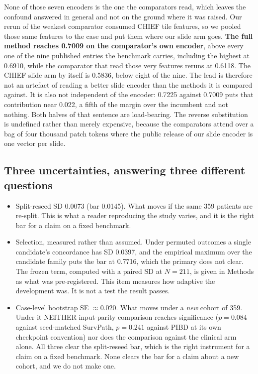 \documentclass[unnumsec,webpdf,contemporary,large]{oup-authoring-template}
\begin{document}
None of those seven encoders is the one the comparators read, which leaves the confound answered in
general and not on the ground where it was raised. Our rerun of the weakest comparator consumed
CHIEF tile features, so we pooled those same features to the case and put them where our slide arm
goes. \textbf{The full method reaches 0.7009 on the comparator's own encoder}, above every one of
the nine published entries the benchmark carries, including the highest at 0.6910, while the
comparator that read those very features reruns at 0.6118. The CHIEF slide arm by itself is 0.5836,
below eight of the nine. The lead is therefore not an artefact of reading a better slide encoder
than the methods it is compared against. It is also not independent of the encoder: 0.7225 against
0.7009 puts that contribution near 0.022, a fifth of the margin over the incumbent and not nothing.
Both halves of that sentence are load-bearing. The reverse substitution is undefined rather than
merely expensive, because the comparators attend over a bag of four thousand patch tokens where the
public release of our slide encoder is one vector per slide.

\subsection{Three uncertainties, answering three different questions}
\label{sec:uncertainty}

\begin{itemize}
  \item Split-reseed SD 0.0073 (bar 0.0145). What moves if the same 359 patients are
    re-split. This is what a reader reproducing the study varies, and it is the right bar for a
    claim on a fixed benchmark.
  \item Selection, measured rather than assumed. Under permuted outcomes a single candidate's
    concordance has SD 0.0397, and the empirical maximum over the candidate family puts the
    bar at 0.7716, which the primary does not clear. The frozen term, computed with a paired SD
    at $N=211$, is given in Methods as what was pre-registered. This item measures how adaptive
    the development was. It is not a test the result passes.
  \item Case-level bootstrap SE $\approx 0.020$. What moves under a \emph{new} cohort of
    359. Under it NEITHER input-parity comparison reaches significance ($p=0.084$ against seed-matched SurvPath, $p=0.241$ against PIBD at its own checkpoint convention) nor does
    the comparison against the clinical arm alone. All three clear the split-reseed bar, which is
    the right instrument for a claim on a fixed benchmark. None clears the bar for a claim about a
    new cohort, and we do not make one.
\end{itemize}
\end{document}
